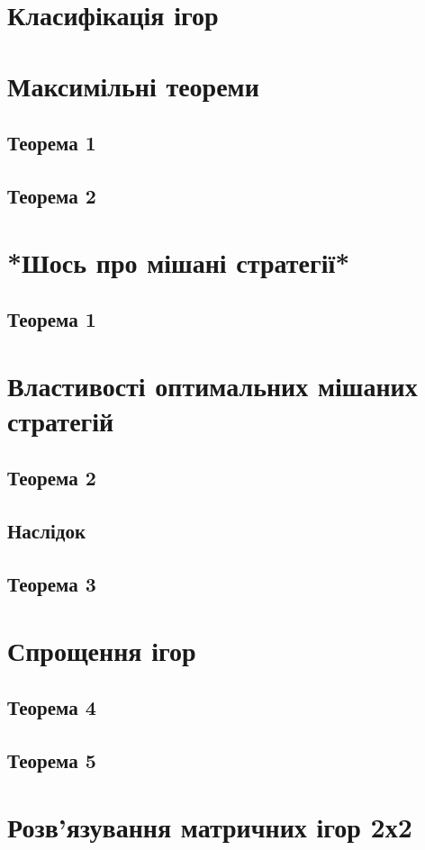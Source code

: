 \documentclass[12pt,a4paper]{book}
\begin{document}
\section{Класифікація ігор}
\section{Максимільні теореми}
\subsection{Теорема 1}
\subsection{Теорема 2}
\section{*Шось про мішані стратегії*}
\subsection{Теорема 1}
\section{Властивості оптимальних мішаних стратегій}
\subsection{Теорема 2}
\subsection{Наслідок}
\subsection{Теорема 3}
\section{Спрощення ігор}
\subsection{Теорема 4}
\subsection{Теорема 5}
\section{Розв’язування матричних ігор 2х2}
\end{document}
